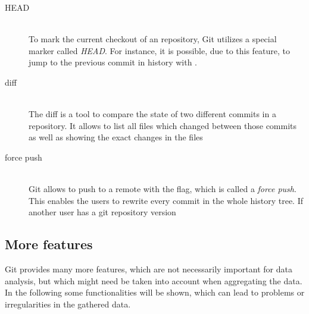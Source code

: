 \begin{description}
    \item[HEAD] \hfill \\
        To mark the current checkout of an repository, Git utilizes a special marker called \emph{HEAD}.
        For instance, it is possible, due to this feature, to jump to the previous commit in history with .

    \item[diff] \hfill \\
        The diff is a tool to compare the state of two different commits in a repository.
        It allows to list all files which changed between those commits as well as showing the exact changes in the files

    \item[force push] \hfill \\
        Git allows to push to a remote with the  flag, which is called a \emph{force push}.
        This enables the users to rewrite every commit in the whole history tree. If another user has a git repository version
\end{description}


\subsection{More features}\label{more-git-features}

Git provides many more features, which are not necessarily important for data analysis, but which might need be taken into account when aggregating the data.
In the following some functionalities will be shown, which can lead to problems or irregularities in the gathered data.

